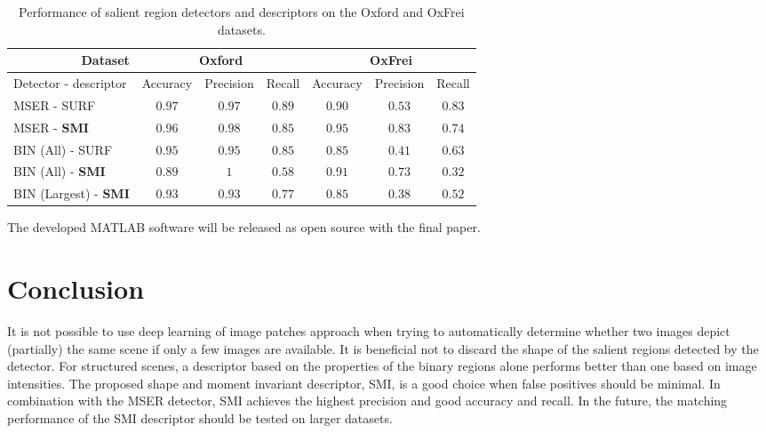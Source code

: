 \documentclass[a4paper,11pt]{article}
\begin{document}
\begin{table}[!ht]
\begin{center}
  \vspace{-4pt}
\begin{tabular}{|l|*{6}{c|}}  %
\hline
\multicolumn{1}{|r}{Dataset} & \multicolumn{3}{|c|}{Oxford}  & \multicolumn{3}{|c|}{OxFrei} \\ \hline
{Detector - descriptor}  & Accuracy      & Precision   &  Recall       & Accuracy        & Precision & Recall \\ \hline
MSER - SURF              & {\boldmath $0.97$} & $0.97$     & {\boldmath $0.89$} &  $0.90$         & $0.53$    & {\boldmath $0.83$}\\ \hline
MSER - \bf{SMI}          & {\boldmath $0.96$}       & {\boldmath $0.98$}&  {\boldmath$0.85$}       & {\boldmath $0.95$}    &{\boldmath $0.83$} &  {\boldmath$0.74$} \\ \hline
BIN (All) - SURF         & $0.95$       & $0.95$     &$0.85$        & $0.85$          & $0.41$    & $0.63$\\ \hline
BIN (All) - \bf{SMI}     & $0.89$        & {\boldmath $1$}   &$0.58$         & $0.91$          & $0.73$    & $0.32$\\ \hline
BIN (Largest) - \bf{SMI} & $0.93$        & $0.93$      &$0.77$         & $0.85$          & $0.38$    & $0.52$\\ \hline
\end{tabular}
\end{center}
\vspace{-18pt}
\caption{\small Performance of salient region detectors and descriptors on the Oxford and OxFrei datasets.} \label{tab:perf}
  \vspace{-10pt}
\end{table}

The developed MATLAB software will be released as open source with the final paper.

\section{Conclusion}
It is not possible to use deep learning of image patches approach when trying to automatically determine whether two images depict (partially) the same scene if only a few images are available. It is beneficial not to discard the shape of the salient regions detected by the detector. For structured scenes, a descriptor based on the properties of the binary regions alone performs better than one based on image intensities.  The proposed shape and moment invariant descriptor, SMI, is a good choice when false positives should be minimal. In combination with the MSER detector, SMI achieves the highest precision and good accuracy and recall. In the future, the matching performance of the SMI descriptor should be tested on larger datasets.
\end{document}
